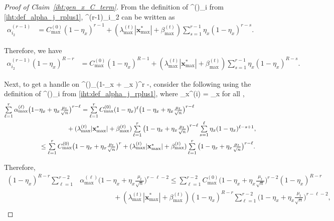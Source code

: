 \documentclass{article}
\def\[#1\]{{$#1$}}
\def\b#1{{\mathbf{#1}}}
\begin{document}
\begin{proof}[Proof of Claim~\ref{iht:gen_x_C_term}]
	From the definition of \[ \alpha^{(\ell)}_{i}\] from \eqref{iht:def_alpha_j_rplus1}, \[ \alpha^{(r-1)}_{i_2}\] can be written as
	\begin{align*}
	\alpha^{(r-1)}_{i_2} &= C_{\max}^{(0)} (1 - \eta_x)^{r-1}  + (\lambda^{(t)}_{\max} |\b{x}_{\max}^*| +\beta^{(t)}_{\max}) \textstyle\sum\limits_{s=1}^{r-1}\eta_x (1-\eta_x)^{r-s}.
	
	
	\end{align*}
	
	Therefore, we have
	\begin{align*}
	\alpha^{(r-1)}_{i_2}(1- \eta_x)^{{R} - r}
	
	&= C_{\max}^{(0)} (1 - \eta_x)^{{R} - 1}  + (\lambda^{(t)}_{\max} |\b{x}_{\max}^*| +\beta^{(t)}_{\max}) \textstyle\sum\limits_{s=1}^{r-1}\eta_x(1- \eta_x)^{{R} - s}. 
	
	
	
	\end{align*}
	
	Next, to get a handle on \[ \alpha^{(\ell)}_{\max}\big(1-\eta_x + \eta_x \big)^{r -}\], consider the following using the definition of \[ \alpha^{(\ell)}_{i}\] from \eqref{iht:def_alpha_j_rplus1}, where \[\eta_x^{(i)} = \eta_x\] for all \[i\],
	\begin{align*}
	\textstyle\sum\limits_{\ell = 1}^{r}  \alpha^{(\ell)}_{\max}\big(1-&\eta_x + \eta_x\tfrac{\mu_t}{\sqrt{n}} \big)^{r -\ell}
    = \textstyle\sum\limits_{\ell = 1}^{r}  C_{\max}^{(0)} (1 - \eta_x)^{\ell}\big(1-\eta_x + \eta_x\tfrac{\mu_t}{\sqrt{n}} \big)^{r -\ell}  \\& \hspace{1.5cm}+ (\lambda^{(t)}_{\max} |\b{x}_{\max}^*| +\beta^{(t)}_{\max})\textstyle\sum\limits_{\ell = 1}^{r} \big(1-\eta_x + \eta_x\tfrac{\mu_t}{\sqrt{n}} \big)^{r -\ell} \textstyle\sum\limits_{s=1}^{\ell}\eta_x (1-\eta_x)^{\ell-s + 1},\\
	
	&\leq \textstyle\sum\limits_{\ell = 1}^{r}  C_{\max}^{(0)} \big(1-\eta_x + \eta_x\tfrac{\mu_t}{\sqrt{n}} \big)^{r}  + (\lambda^{(t)}_{\max} |\b{x}_{\max}^*| +\beta^{(t)}_{\max})\textstyle\sum\limits_{\ell = 1}^{r} \big(1-\eta_x + \eta_x\tfrac{\mu_t}{\sqrt{n}} \big)^{r -\ell}.
	
	\end{align*}
	
	Therefore, 
	\begin{align*}
	(1- \eta_x)^{{R} - r } \textstyle\sum\limits_{\ell = 1}^{r-2}  &\alpha^{(\ell)}_{\max}\big(1-\eta_x + \eta_x\tfrac{\mu_t}{\sqrt{n}} \big)^{r -\ell-2}
	\leq \textstyle\sum\limits_{\ell = 1}^{r-2}  C_{\max}^{(0)} \big(1-\eta_x + \eta_x\tfrac{\mu_t}{\sqrt{n}} \big)^{r -2}(1- \eta_x)^{{R} - r}  \\& \hspace{2cm}+ (\lambda^{(t)}_{\max} |\b{x}_{\max}^*| +\beta^{(t)}_{\max})(1- \eta_x)^{{R} - r}\textstyle\sum\limits_{\ell = 1}^{r-2} \big(1-\eta_x + \eta_x\tfrac{\mu_t}{\sqrt{n}} \big)^{r -\ell - 2},\\


\end{align*}
\end{proof}
\end{document}
